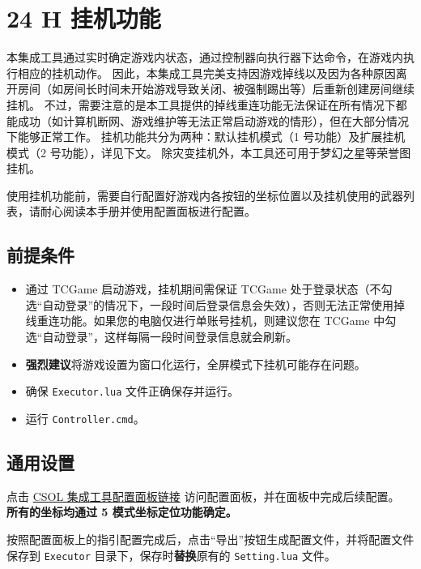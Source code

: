 \section{24 H 挂机功能}

本集成工具通过实时确定游戏内状态，通过控制器向执行器下达命令，在游戏内执行相应的挂机动作。
因此，本集成工具完美支持因游戏掉线以及因为各种原因离开房间（如房间长时间未开始游戏导致关闭、被强制踢出等）后重新创建房间继续挂机。
不过，需要注意的是本工具提供的掉线重连功能无法保证在所有情况下都能成功（如计算机断网、游戏维护等无法正常启动游戏的情形），但在大部分情况下能够正常工作。
挂机功能共分为两种：默认挂机模式（1 号功能）及扩展挂机模式（2 号功能），详见下文。
除灾变挂机外，本工具还可用于梦幻之星等荣誉图挂机。

使用挂机功能前，需要自行配置好游戏内各按钮的坐标位置以及挂机使用的武器列表，请耐心阅读本手册并使用配置面板进行配置。

\subsection{前提条件}

\begin{itemize}

\item 通过 TCGame 启动游戏，挂机期间需保证 TCGame 处于登录状态（不勾选“自动登录”的情况下，一段时间后登录信息会失效），否则无法正常使用掉线重连功能。如果您的电脑仅进行单账号挂机，则建议您在 TCGame 中勾选“自动登录”，这样每隔一段时间登录信息就会刷新。

\item \textbf{\color{red}强烈建议}将游戏设置为窗口化运行，全屏模式下挂机可能存在问题。

\item 确保 \lstinline{Executor.lua} 文件正确保存并运行。

\item 运行 \lstinline{Controller.cmd}。

\end{itemize}

\subsection{通用设置}

点击 \href{https://www.macrohard.fun/CSOL-Utilities/panel}{CSOL 集成工具配置面板链接} 访问配置面板，并在面板中完成后续配置。
\textbf{\color{red}所有的坐标均通过 5 模式坐标定位功能确定。}

按照配置面板上的指引配置完成后，点击“导出”按钮生成配置文件，并将配置文件保存到 \lstinline{Executor} 目录下，保存时\textbf{\color{red}替换}原有的 \lstinline{Setting.lua} 文件。

